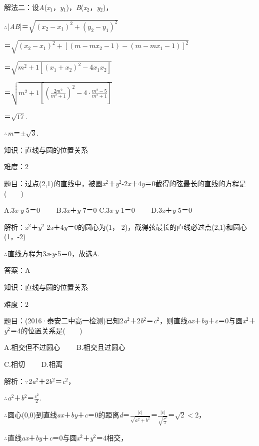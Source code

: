 \documentclass{article} %
\begin{document}
解法二：设\textit{A}(\textit{x}${}_{1}$，\textit{y}${}_{1}$)，\textit{B}(\textit{x}${}_{2}$，\textit{y}${}_{2}$)，

$\mathrm{\therefore}$|\textit{AB}|＝$\sqrt{(x_2-x_1)^2+(y_2-y_1)^2}$

＝$\sqrt{(x_2-x_1)^2+[(m-mx_2-1)-(m-mx_1-1)]^2}$

＝$\sqrt{m^2+1[(x_1+x_2)^2-4x_1x_2]}$

＝$\sqrt{m^2+1[(\frac{2m^2}{m^2+1})^2-4\cdot\frac{m^2-5}{m^2+1}]}$

＝$\sqrt{17}$.

$\mathrm{\therefore}$\textit{m}＝$\mathrm{\pm}\sqrt{3}$.

知识：直线与圆的位置关系

难度：2

题目：过点(2,1)的直线中，被圆\textit{x}${}^{2}$＋\textit{y}${}^{2}$-2\textit{x}＋4\textit{y}＝0截得的弦最长的直线的方程是(　　)

A.3\textit{x}-\textit{y}-5＝0　　 B.3\textit{x}＋\textit{y}-7＝0 C.3\textit{x}-\textit{y}-1＝0　　 D.3\textit{x}＋\textit{y}-5＝0

解析：\textit{x}${}^{2}$＋\textit{y}${}^{2}$-2\textit{x}＋4\textit{y}＝0的圆心为(1，-2)，截得弦最长的直线必过点(2,1)和圆心(1，-2)

$\mathrm{\therefore}$直线方程为3\textit{x}-\textit{y}-5＝0，故选A.

答案：A

知识：直线与圆的位置关系

难度：2

题目：(2016·泰安二中高一检测)已知2\textit{a}${}^{2}$＋2\textit{b}${}^{2}$＝\textit{c}${}^{2}$，则直线\textit{ax}＋\textit{by}＋\textit{c}＝0与圆\textit{x}${}^{2}$＋\textit{y}${}^{2}$＝4的位置关系是(　　)

A.相交但不过圆心　　 B.相交且过圆心

C.相切　　                     D.相离

解析：$\mathrm{\because}$2\textit{a}${}^{2}$＋2\textit{b}${}^{2}$＝\textit{c}${}^{2}$，

$\mathrm{\therefore}$\textit{a}${}^{2}$＋\textit{b}${}^{2}$＝$\frac{c^2}{2}$.

$\mathrm{\therefore}$圆心(0,0)到直线\textit{ax}＋\textit{by}＋\textit{c}＝0的距离\textit{d}＝$\frac{|c|}{\sqrt{a^2+b^2}}$＝$\frac{|c|}{\sqrt{\frac{c^2}{2}}}$＝$\sqrt{2}\mathrm{<}$2，

$\mathrm{\therefore}$直线\textit{ax}＋\textit{by}＋\textit{c}＝0与圆\textit{x}${}^{2}$＋\textit{y}${}^{2}$＝4相交，
\end{document}
